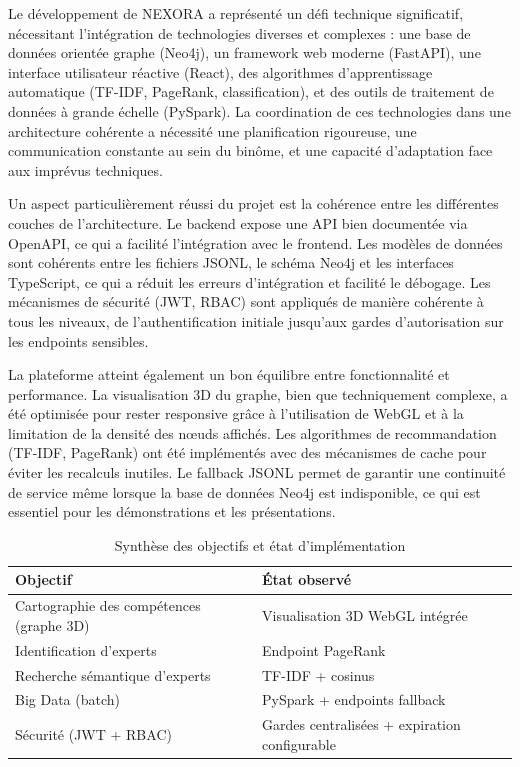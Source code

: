 \documentclass[12pt,a4paper]{report}
\begin{document}
Le développement de NEXORA a représenté un défi technique significatif, nécessitant l'intégration de technologies diverses et complexes : une base de données orientée graphe (Neo4j), un framework web moderne (FastAPI), une interface utilisateur réactive (React), des algorithmes d'apprentissage automatique (TF-IDF, PageRank, classification), et des outils de traitement de données à grande échelle (PySpark). La coordination de ces technologies dans une architecture cohérente a nécessité une planification rigoureuse, une communication constante au sein du binôme, et une capacité d'adaptation face aux imprévus techniques.

Un aspect particulièrement réussi du projet est la cohérence entre les différentes couches de l'architecture. Le backend expose une API bien documentée via OpenAPI, ce qui a facilité l'intégration avec le frontend. Les modèles de données sont cohérents entre les fichiers JSONL, le schéma Neo4j et les interfaces TypeScript, ce qui a réduit les erreurs d'intégration et facilité le débogage. Les mécanismes de sécurité (JWT, RBAC) sont appliqués de manière cohérente à tous les niveaux, de l'authentification initiale jusqu'aux gardes d'autorisation sur les endpoints sensibles.

La plateforme atteint également un bon équilibre entre fonctionnalité et performance. La visualisation 3D du graphe, bien que techniquement complexe, a été optimisée pour rester responsive grâce à l'utilisation de WebGL et à la limitation de la densité des nœuds affichés. Les algorithmes de recommandation (TF-IDF, PageRank) ont été implémentés avec des mécanismes de cache pour éviter les recalculs inutiles. Le fallback JSONL permet de garantir une continuité de service même lorsque la base de données Neo4j est indisponible, ce qui est essentiel pour les démonstrations et les présentations.

\begin{table}[H]
\centering
\caption{Synthèse des objectifs et état d'implémentation}
\label{tab:objectives_summary}
\begin{tabular}{p{6.5cm} p{7.5cm}}
\toprule
\textbf{Objectif} & \textbf{État observé} \\
\midrule
Cartographie des compétences (graphe 3D) & Visualisation 3D WebGL intégrée \\
Identification d'experts & Endpoint PageRank \\
Recherche sémantique d'experts & TF-IDF + cosinus \\
Big Data (batch) & PySpark + endpoints fallback \\
Sécurité (JWT + RBAC) & Gardes centralisées + expiration configurable \\
\bottomrule
\end{tabular}
\end{table}
\end{document}
